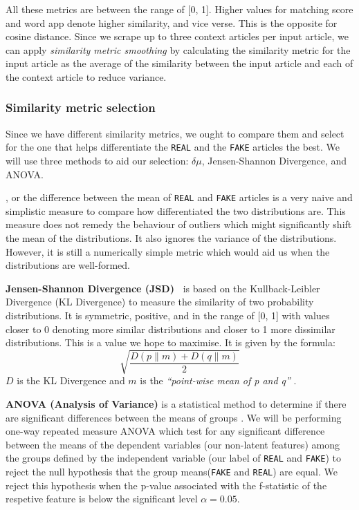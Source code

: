 \documentclass{article}
\begin{document}
All these metrics are between the range of [0, 1]. Higher values for matching score and word app denote higher similarity, and vice verse. This is the opposite for cosine distance. Since we scrape up to three context articles per input article, we can apply \emph{similarity metric smoothing} by calculating the similarity metric for the input article as the average of the similarity between the input article and each of the context article to reduce variance.

\subsubsection{Similarity metric selection}\label{section:similarity-metric-selection}
Since we have different similarity metrics, we ought to compare them and select for the one that helps differentiate the \texttt{REAL} and the \texttt{FAKE} articles the best. We will use three methods to aid our selection: $\delta \mu$, Jensen-Shannon Divergence, and ANOVA.

\boldsymbol{$\delta \mu$}, or the difference between the mean of \texttt{REAL} and \texttt{FAKE} articles is a very naive and simplistic measure to compare how differentiated the two distributions are. This measure does not remedy the behaviour of outliers which might significantly shift the mean of the distributions. It also ignores the variance of the distributions. However, it is still a numerically simple metric which would aid us when the distributions are well-formed.

\textbf{Jensen-Shannon Divergence (JSD)~\cite{scipy}} is based on the Kullback-Leibler Divergence (KL Divergence) to measure the similarity of two probability distributions. It is symmetric, positive, and in the range of [0, 1] with values closer to 0 denoting more similar distributions and closer to 1 more dissimilar distributions. This is a value we hope to maximise. It is given by the formula:
\[\sqrt{\frac{D(p \parallel m) + D(q \parallel m)}{2}}\]
$D$ is the KL Divergence and $m$ is the \emph{``point-wise mean of p and q''} \cite{scipy}.

\textbf{ANOVA (Analysis of Variance)} is a statistical method to determine if there are significant differences between the means of groups \cite{anova}. We will be performing one-way repeated measure ANOVA which test for any significant difference between the means of the dependent variables (our non-latent features) among the groups defined by the independent variable (our label of \texttt{REAL} and \texttt{FAKE}) to reject the null hypothesis that the group means(\texttt{FAKE} and \texttt{REAL}) are equal. We reject this hypothesis when the p-value associated with the f-statistic of the respetive feature is below the significant level $\alpha = 0.05$.
\end{document}
